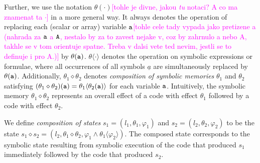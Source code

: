 \documentclass{sig-alternate}%
\newcommand{\note}[1]{{\scriptsize{{\textcolor{magenta}{[#1]}}}}}
\newcommand{\var}[1]{{\tt #1}}
\newcommand{\sym}[1]{\ensuremath{\underline{#1}}}
\newcommand{\compose}{\ensuremath{\diamond}}
\begin{document}
Further, we use the notation $\theta(\cdot)$\note{tohle je divne, jakou
\emph{tu} notaci? A co ma znamenat ta $\cdot$} in a more general way. It
always denotes the operation of replacing each (scalar or array) variable
$\var{a}$\note{tohle cele tady vypada jako pretizene a (nahrada za $\var{a}$ a
$\var{A}$, nestalo by za to zavest nejake v, coz by zahrnulo a nebo A, takhle
se v tom orientuje spatne. Treba v dalsi vete ted nevim, jestli se to definuje
i pro A.)} by $\theta(\var{a})$.  $\theta\langle\cdot\rangle$ denotes the
operation on symbolic expressions or formulae, where all occurrences of all
symbols $\sym{a}$ are simultaneously replaced by
$\theta(\var{a})$. Additionally, $\theta_1\compose\theta_2$ denotes
\emph{composition of symbolic memories} $\theta_1$ and $\theta_2$ satisfying
$(\theta_1\compose\theta_2)(\var{a})=\theta_1\langle\theta_2(\var{a})\rangle$
for each variable $\var{a}$. Intuitively, the symbolic memory
$\theta_1\compose\theta_2$ represents an overall effect of a code with
effect $\theta_1$ followed by a code with effect $\theta_2$.


We define \emph{composition of states} $s_1=(l_1,\theta_1,\varphi_1)$ and
$s_2=(l_2,\theta_2,\varphi_2)$ to be the state $s_1\compose
s_2=(l_2,\theta_1\compose\theta_2,\varphi_1\wedge\theta_1\langle\varphi_2\rangle)$. The
composed state corresponds to the symbolic state resulting from symbolic
execution of the code that produced $s_1$ immediately followed by the code
that produced $s_2$. 

\end{document}

